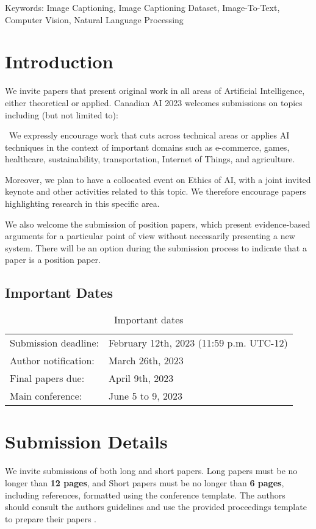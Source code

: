 \documentclass[10pt]{cai}
\begin{document}
\begin{keywords}{Keywords:}
  Image Captioning, Image Captioning Dataset, Image-To-Text, Computer Vision, Natural Language Processing
\end{keywords}
\copyrightnotice

\section{Introduction}
\label{intro}
We invite papers that present original work in all areas of Artificial Intelligence, either theoretical or applied. Canadian AI 2023 welcomes submissions on topics including (but not limited to):

\
We expressly encourage work that cuts across technical areas or applies AI techniques in the context of important domains such as e-commerce, games, healthcare, sustainability,  transportation, Internet of Things, and agriculture.

Moreover, we plan to have a collocated event on Ethics of AI, with a joint invited keynote and other activities related to this topic. We therefore encourage papers highlighting research in this specific area.

We also welcome the submission of position papers, which present evidence-based arguments for a particular point of view without necessarily presenting a new system. There will be an option during the submission process to indicate that a paper is a position paper.

\subsection{Important Dates}
\label{important}

\begin{table}[h]
\begin{tabular}{ |l|l| }
 Submission deadline: & February 12th, 2023 (11:59 p.m. UTC-12) \\ 
 Author notification: & March 26th, 2023 \\  
 Final papers due: & April 9th, 2023 \\
 Main conference: & June 5 to 9, 2023
\end{tabular}
\vspace{0.2cm}
\caption{Important dates}
\label{tab:important}
\end{table}

\section{Submission Details}
\label{submission}
We invite submissions of both long and short papers. Long papers must be no longer than \textbf{12 pages}, and Short papers must be no longer than \textbf{6 pages}, including references, formatted using the conference template. The authors should consult the authors guidelines and use the provided proceedings template to prepare their papers  \cite{cai2020,author1_name_author_2020}.
\end{document}

